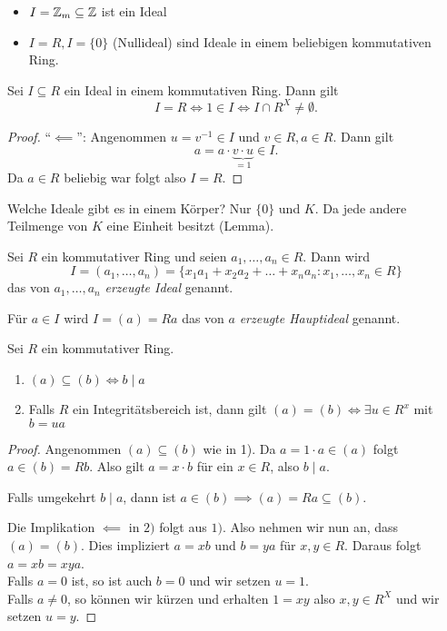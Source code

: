 \begin{eg}
	\begin{itemize}
		\item $I = \mathbb{Z}_{m} \subseteq \mathbb{Z}$ ist ein Ideal
		\item $I = R, I = \{0\}$ (Nullideal) sind Ideale in einem beliebigen kommutativen Ring.
	\end{itemize}
\end{eg}

\begin{lemma}
	Sei $I \subseteq R$ ein Ideal in einem kommutativen Ring. Dann gilt 
	\[
	I = R \Leftrightarrow 1 \in I \Leftrightarrow I \cap R^{X} \neq \emptyset
	.\] 
\end{lemma}

\begin{proof}
	\enquote{$\impliedby$}: Angenommen $u = v^{-1} \in I$ und $v \in R, a \in R$. Dann gilt
	\[
	a = a \cdot \underbrace{v\cdot u}_{=1} \in I
	.\] 
	Da $a \in R$ beliebig war folgt also $I = R$.
\end{proof}

\begin{eg}
	Welche Ideale gibt es in einem Körper?
	Nur $\{0\}$ und $K$. Da jede andere Teilmenge von $K$ eine Einheit besitzt (Lemma).
\end{eg}

\begin{definition}
	Sei $R$ ein kommutativer Ring und seien $a_1,\ldots,a_{n} \in R$. Dann wird
	\[
		I = (a_1,\ldots,a_{n}) = \{x_1 a_1 + x_2 a_2 + \ldots + x_{n} a_{n} : x_1,\ldots,x_{n} \in R\} 
	\] 
	das von $a_1,\ldots,a_{n}$ \emph{erzeugte Ideal} genannt.

	Für $a \in I$ wird $I = (a) = Ra$ das von $a$ \emph{erzeugte Hauptideal} genannt.
\end{definition}

\begin{lemma}
	Sei $R$ ein kommutativer Ring.
	\begin{enumerate}[1)]
		\item $(a) \subseteq (b) \Leftrightarrow b \mid a$ 
		\item Falls $R $ ein Integritätsbereich ist, dann gilt $(a) = (b) \Leftrightarrow \exists u \in R^{x}$ mit $b = ua$
	\end{enumerate}
\end{lemma}

\begin{proof}
	Angenommen $(a) \subseteq (b)$ wie in 1). Da $a = 1\cdot a \in (a)$ folgt $a \in (b) = Rb$.
	Also gilt $a = x \cdot b$ für ein $x \in R$, also $b \mid a$.

	Falls umgekehrt $b \mid a$, dann ist $a \in (b) \implies (a) = R a \subseteq (b)$.

	Die Implikation $\impliedby$ in $2)$ folgt aus $1)$.
	Also nehmen wir nun an, dass $(a) = (b)$.
	Dies impliziert $a = xb$ und  $b = ya$ für $x,y \in R$.
	Daraus folgt $a = x b = xy a$.\\
	Falls  $a = 0$ ist, so ist auch $b = 0$ und wir setzen $u = 1$.\\
	Falls $a \neq 0$, so können wir kürzen und erhalten $1 = xy$ also $x,y \in R^{X}$ und wir setzen $u = y$.
\end{proof}

